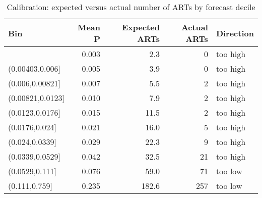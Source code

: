 \begin{table}[t]

\caption{\label{tab:calibration}Calibration: expected versus actual number of ARTs by forecast decile}
\centering
\begin{tabular}{lrrrl}
\toprule
Bin & Mean P & Expected ARTs & Actual ARTs & Direction\\
\midrule
[0.000914,0.00403] & 0.003 & 2.3 & 0 & too high\\
(0.00403,0.006] & 0.005 & 3.9 & 0 & too high\\
(0.006,0.00821] & 0.007 & 5.5 & 2 & too high\\
(0.00821,0.0123] & 0.010 & 7.9 & 2 & too high\\
(0.0123,0.0176] & 0.015 & 11.5 & 2 & too high\\
\addlinespace
(0.0176,0.024] & 0.021 & 16.0 & 5 & too high\\
(0.024,0.0339] & 0.029 & 22.3 & 9 & too high\\
(0.0339,0.0529] & 0.042 & 32.5 & 21 & too high\\
(0.0529,0.111] & 0.076 & 59.0 & 71 & too low\\
(0.111,0.759] & 0.235 & 182.6 & 257 & too low\\
\bottomrule
\end{tabular}
\end{table}
